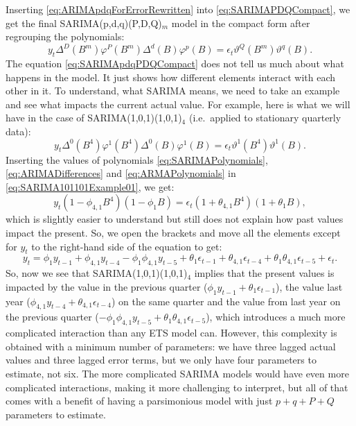 \documentclass[
]{book}
\theoremstyle{definition}
\theoremstyle{definition}
\theoremstyle{definition}
\theoremstyle{definition}
\theoremstyle{remark}
\begin{document}
Inserting \eqref{eq:ARIMApdqForErrorRewritten} into \eqref{eq:SARIMAPDQCompact}, we get the final SARIMA(p,d,q)(P,D,Q)\(_m\) model in the compact form after regrouping the polynomials:
\begin{equation}
  y_t \Delta^D(B^m) \varphi^P(B^m) \Delta^d(B) \varphi^p(B) = \epsilon_t \vartheta^Q(B^m) \vartheta^q(B) .
  \label{eq:SARIMApdqPDQCompact}
\end{equation}
The equation \eqref{eq:SARIMApdqPDQCompact} does not tell us much about what happens in the model. It just shows how different elements interact with each other in it. To understand, what SARIMA means, we need to take an example and see what impacts the current actual value. For example, here is what we will have in the case of SARIMA(1,0,1)(1,0,1)\(_4\) (i.e.~applied to stationary quarterly data):
\begin{equation}
  y_t \Delta^0(B^4) \varphi^1(B^4) \Delta^0(B) \varphi^1(B) = \epsilon_t \vartheta^1(B^4) \vartheta^1(B) .
  \label{eq:SARIMA101101Example01}
\end{equation}
Inserting the values of polynomials \eqref{eq:SARIMAPolynomials}, \eqref{eq:ARIMADifferences} and \eqref{eq:ARMAPolynomials} in \eqref{eq:SARIMA101101Example01}, we get:
\begin{equation}
  y_t (1 -\phi_{4,1} B^4)(1 -\phi_{1} B) = \epsilon_t (1 + \theta_{4,1} B^4) (1 + \theta_{1} B),
  \label{eq:SARIMA101101Example02}
\end{equation}
which is slightly easier to understand but still does not explain how past values impact the present. So, we open the brackets and move all the elements except for \(y_t\) to the right-hand side of the equation to get:
\begin{equation}
  y_t = \phi_{1} y_{t-1} + \phi_{4,1} y_{t-4} -\phi_{1} \phi_{4,1} y_{t-5} + \theta_1 \epsilon_{t-1} + \theta_{4,1} \epsilon_{t-4} + \theta_{1} \theta_{4,1} \epsilon_{t-5} + \epsilon_t .
  \label{eq:SARIMA101101Example03}
\end{equation}
So, now we see that SARIMA(1,0,1)(1,0,1)\(_4\) implies that the present values is impacted by the value in the previous quarter (\(\phi_{1} y_{t-1} + \theta_1 \epsilon_{t-1}\)), the value last year (\(\phi_{4,1} y_{t-4} + \theta_{4,1} \epsilon_{t-4}\)) on the same quarter and the value from last year on the previous quarter (\(-\phi_{1} \phi_{4,1} y_{t-5} + \theta_{1} \theta_{4,1} \epsilon_{t-5}\)), which introduces a much more complicated interaction than any ETS model can. However, this complexity is obtained with a minimum number of parameters: we have three lagged actual values and three lagged error terms, but we only have four parameters to estimate, not six. The more complicated SARIMA models would have even more complicated interactions, making it more challenging to interpret, but all of that comes with a benefit of having a parsimonious model with just \(p+q+P+Q\) parameters to estimate.
\end{document}
